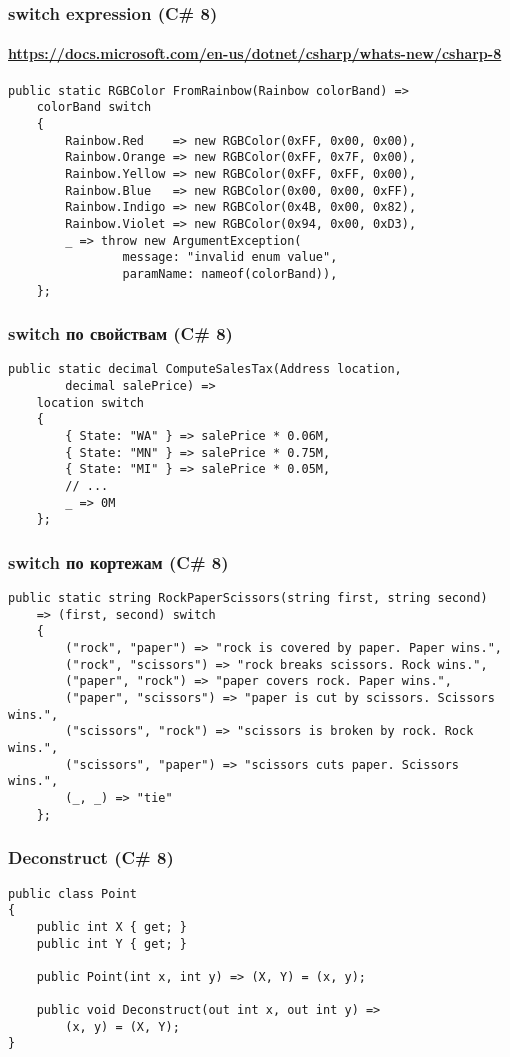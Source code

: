 \documentclass[xetex,mathserif,serif]{beamer}
\begin{document}
	\begin{frame}[fragile]
		\frametitle{switch expression (C\# 8)}
		\framesubtitle{\url{https://docs.microsoft.com/en-us/dotnet/csharp/whats-new/csharp-8}}
		\begin{verbatim}
public static RGBColor FromRainbow(Rainbow colorBand) =>
    colorBand switch
    {
        Rainbow.Red    => new RGBColor(0xFF, 0x00, 0x00),
        Rainbow.Orange => new RGBColor(0xFF, 0x7F, 0x00),
        Rainbow.Yellow => new RGBColor(0xFF, 0xFF, 0x00),
        Rainbow.Blue   => new RGBColor(0x00, 0x00, 0xFF),
        Rainbow.Indigo => new RGBColor(0x4B, 0x00, 0x82),
        Rainbow.Violet => new RGBColor(0x94, 0x00, 0xD3),
        _ => throw new ArgumentException(
                message: "invalid enum value", 
                paramName: nameof(colorBand)),
    };
		\end{verbatim}
	\end{frame}

	\begin{frame}[fragile]
		\frametitle{switch по свойствам (C\# 8)}
		\begin{verbatim}
public static decimal ComputeSalesTax(Address location, 
        decimal salePrice) =>
    location switch
    {
        { State: "WA" } => salePrice * 0.06M,
        { State: "MN" } => salePrice * 0.75M,
        { State: "MI" } => salePrice * 0.05M,
        // ...
        _ => 0M
    };
		\end{verbatim}
	\end{frame}

	\begin{frame}[fragile]
		\frametitle{switch по кортежам (C\# 8)}
		\begin{verbatim}
public static string RockPaperScissors(string first, string second)
    => (first, second) switch
    {
        ("rock", "paper") => "rock is covered by paper. Paper wins.",
        ("rock", "scissors") => "rock breaks scissors. Rock wins.",
        ("paper", "rock") => "paper covers rock. Paper wins.",
        ("paper", "scissors") => "paper is cut by scissors. Scissors wins.",
        ("scissors", "rock") => "scissors is broken by rock. Rock wins.",
        ("scissors", "paper") => "scissors cuts paper. Scissors wins.",
        (_, _) => "tie"
    };
		\end{verbatim}
	\end{frame}

	\begin{frame}[fragile]
		\frametitle{Deconstruct (C\# 8)}
		\begin{verbatim}
public class Point
{
    public int X { get; }
    public int Y { get; }

    public Point(int x, int y) => (X, Y) = (x, y);

    public void Deconstruct(out int x, out int y) =>
        (x, y) = (X, Y);
}
		\end{verbatim}
	\end{frame}
\end{document}
